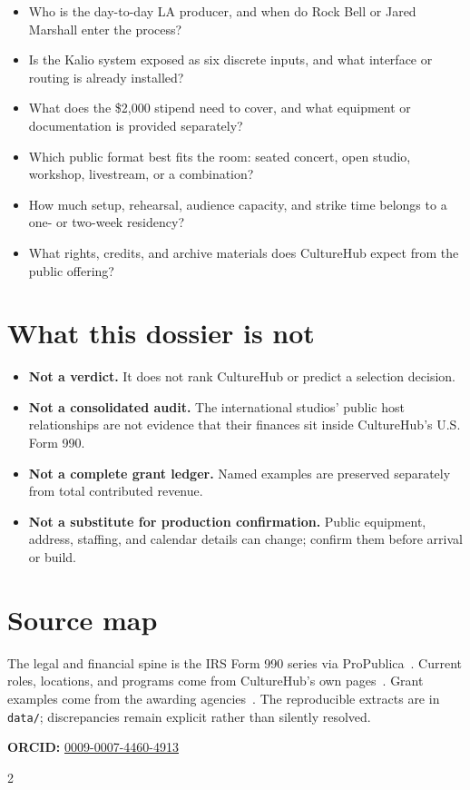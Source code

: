 \documentclass[10pt,letterpaper,twocolumn]{article}
\begin{document}
\begin{itemize}
\item Who is the day-to-day LA producer, and when do Rock Bell or Jared Marshall enter the process?
\item Is the Kalio system exposed as six discrete inputs, and what interface or routing is already installed?
\item What does the \$2,000 stipend need to cover, and what equipment or documentation is provided separately?
\item Which public format best fits the room: seated concert, open studio, workshop, livestream, or a combination?
\item How much setup, rehearsal, audience capacity, and strike time belongs to a one- or two-week residency?
\item What rights, credits, and archive materials does CultureHub expect from the public offering?
\end{itemize}

\section{What this dossier is not}

\begin{itemize}
\item \textbf{Not a verdict.} It does not rank CultureHub or predict a selection decision.
\item \textbf{Not a consolidated audit.} The international studios' public host relationships are not evidence that their finances sit inside CultureHub's U.S. Form 990.
\item \textbf{Not a complete grant ledger.} Named examples are preserved separately from total contributed revenue.
\item \textbf{Not a substitute for production confirmation.} Public equipment, address, staffing, and calendar details can change; confirm them before arrival or build.
\end{itemize}

\section{Source map}

The legal and financial spine is the IRS Form 990 series via ProPublica~\citep{ch990}. Current roles, locations, and programs come from CultureHub's own pages~\citep{chabout,chny,chla,chresidency}. Grant examples come from the awarding agencies~\citep{nea2023,nysca2020}. The reproducible extracts are in \texttt{data/}; discrepancies remain explicit rather than silently resolved.

\vspace{0.4em}
\noindent\textbf{ORCID:} \href{https://orcid.org/0009-0007-4460-4913}{0009-0007-4460-4913}

\onecolumn
\begin{multicols}{2}

{\footnotesize}
\end{multicols}
\end{document}
